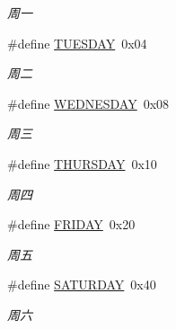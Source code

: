 \begin{DoxyCompactItemize}
\begin{DoxyCompactList}\small\item\em 周一 \end{DoxyCompactList}\item 
\hypertarget{group___r_t_c_ga7e614639937b5dc668fb843882ddf895}{\#define \hyperlink{group___r_t_c_ga7e614639937b5dc668fb843882ddf895}{\-T\-U\-E\-S\-D\-A\-Y}~0x04}\label{group___r_t_c_ga7e614639937b5dc668fb843882ddf895}

\begin{DoxyCompactList}\small\item\em 周二 \end{DoxyCompactList}\item 
\hypertarget{group___r_t_c_gabc50400fb4fc6d0b982a22b5e9644a8c}{\#define \hyperlink{group___r_t_c_gabc50400fb4fc6d0b982a22b5e9644a8c}{\-W\-E\-D\-N\-E\-S\-D\-A\-Y}~0x08}\label{group___r_t_c_gabc50400fb4fc6d0b982a22b5e9644a8c}

\begin{DoxyCompactList}\small\item\em 周三 \end{DoxyCompactList}\item 
\hypertarget{group___r_t_c_ga4383b2bef864f3be7c45bdbfced40e4d}{\#define \hyperlink{group___r_t_c_ga4383b2bef864f3be7c45bdbfced40e4d}{\-T\-H\-U\-R\-S\-D\-A\-Y}~0x10}\label{group___r_t_c_ga4383b2bef864f3be7c45bdbfced40e4d}

\begin{DoxyCompactList}\small\item\em 周四 \end{DoxyCompactList}\item 
\hypertarget{group___r_t_c_gabe9db6f3a1fb60fa435c899c00dd0987}{\#define \hyperlink{group___r_t_c_gabe9db6f3a1fb60fa435c899c00dd0987}{\-F\-R\-I\-D\-A\-Y}~0x20}\label{group___r_t_c_gabe9db6f3a1fb60fa435c899c00dd0987}

\begin{DoxyCompactList}\small\item\em 周五 \end{DoxyCompactList}\item 
\hypertarget{group___r_t_c_gab211cb1e7ca439c7d2c6cc675b0dcc88}{\#define \hyperlink{group___r_t_c_gab211cb1e7ca439c7d2c6cc675b0dcc88}{\-S\-A\-T\-U\-R\-D\-A\-Y}~0x40}\label{group___r_t_c_gab211cb1e7ca439c7d2c6cc675b0dcc88}

\begin{DoxyCompactList}\small\item\em 周六 \end{DoxyCompactList}\end{DoxyCompactItemize}

